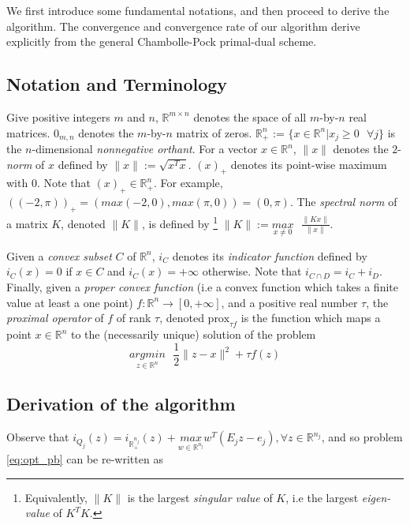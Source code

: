 \documentclass[a4paper,9pt,journal]{IEEEtran}
\begin{document}
We first introduce some fundamental notations, and then proceed to derive the algorithm. The convergence and convergence rate
of our algorithm derive explicitly from the general Chambolle-Pock primal-dual scheme.

\subsection{Notation and Terminology}
Give positive integers $m$ and $n$, $\mathbb{R}^{m \times n}$ denotes
the space of all $m$-by-$n$ real matrices. $0_{m,n}$ denotes the $m$-by-$n$ matrix of zeros.
$\mathbb{R}^n_+$ := $\{x \in \mathbb{R}^n|x_j \ge 0 \text{ }  \forall j\}$ is the $n$-dimensional \textit{nonnegative orthant}.
For a vector $x \in \mathbb{R}^n$, $\|x\|$ denotes the $2$-\textit{norm} of $x$ defined by $\|x\| := \sqrt{x^Tx}$.
$(x)_+$ denotes its point-wise maximum with 0. Note that $(x)_+ \in \mathbb{R}^n_+$.
For example, $((-2, \pi))_+ = (max(-2, 0), max(\pi, 0)) = (0, \pi)$. The \textit{spectral norm} of a matrix $K$, denoted $\|K\|$, is defined by
\footnote{Equivalently, $\|K\|$ is the largest \textit{singular value} of $K$, i.e the largest \textit{eigen-value} of $K^TK$.}
$\|K\| := \underset{x \ne 0}{max}\text{ }\frac{\|Kx\|}{\|x\|}$.

Given a \textit{convex subset} $C$ of $\mathbb{R}^n$, $i_C$ denotes its \textit{indicator function} defined by
$i_C(x) = 0$ if $x \in C$ and $i_C(x) = +\infty$ otherwise. Note that $i_{C \cap D} = i_C + i_D$. Finally, given a \textit{proper convex
function} (i.e a convex function which takes a finite
value at least a one point) $f : \mathbb{R}^n \rightarrow [0, +\infty]$, and a positive real number $\tau$, the \textit{proximal operator} of $f$ of rank $\tau$,
denoted $\text{prox}_{\tau f}$ is the function which maps a point $x \in \mathbb{R}^n$ to the (necessarily unique) solution of the problem
\begin{equation}
  \underset{z \in \mathbb{R}^n}{argmin}\text{ }\frac{1}{2}\|z - x\|^2 + \tau f(z)
\end{equation}


\subsection{Derivation of the algorithm}
Observe that $i_{Q_j}(z) = i_{\mathbb{R}^{n_j}_+}(z) + \underset{w \in \mathbb{R}^{n_j}}{max}\text{}{w^T(E_jz - e_j)}, \forall z \in \mathbb{R}^{n_j}$,
and so problem \eqref{eq:opt_pb} can be re-written as
\end{document}

